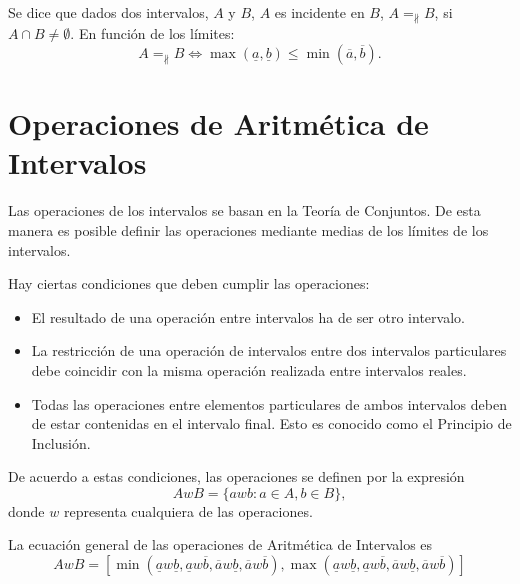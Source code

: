 \begin{definition}
Se dice que dados dos intervalos, $A$ y $B$, $A$ es incidente en $B$, $A =_{\nparallel} B$, si $A \cap B \neq \emptyset$. En función de los límites:
$$A =_{\nparallel} B \iff \max(\underline{a},\underline{b}) \leq \min(\overline{a},\overline{b}).$$
\end{definition}

\section{Operaciones de Aritmética de Intervalos}

Las operaciones de los intervalos se basan en la Teoría de Conjuntos. De esta manera es posible definir las operaciones mediante medias de los límites de los intervalos.


Hay ciertas condiciones que deben cumplir las operaciones:
\begin{itemize}
	\item El resultado de una operación entre intervalos ha de ser otro intervalo.
	\item La restricción de una operación de intervalos entre dos intervalos particulares debe coincidir con la misma operación realizada entre intervalos reales.
	\item Todas las operaciones entre elementos particulares de ambos intervalos deben de estar contenidas en el intervalo final. Esto es conocido como el Principio de Inclusión.
\end{itemize}
De acuerdo a estas condiciones, las operaciones se definen por la expresión
\begin{equation}
AwB = \{ awb : a \in A, b \in B \},
\end{equation}
donde $w$ representa cualquiera de las operaciones.

La ecuación general de las operaciones de Aritmética de Intervalos es
\begin{equation}
AwB = [ \min(\underline{a}w\underline{b},\underline{a}w\overline{b},\overline{a}w\underline{b},\overline{a}w\overline{b}), \max(\underline{a}w\underline{b},\underline{a}w\overline{b},\overline{a}w\underline{b},\overline{a}w\overline{b}) ]
\nonumber
\end{equation}

